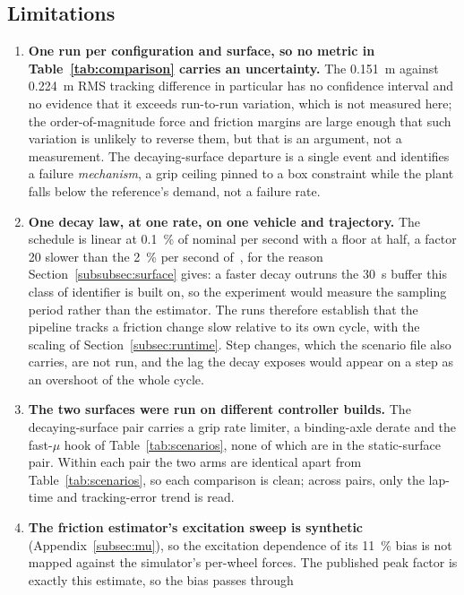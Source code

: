 \subsection{Limitations}
\label{subsec:limits}

\begin{enumerate}
\item \textbf{One run per configuration and surface, so no metric in
Table~\ref{tab:comparison} carries an uncertainty.} The \SI{0.151}{\meter}
against \SI{0.224}{\meter} RMS tracking difference in particular has no
confidence interval and no evidence that it exceeds run-to-run variation, which
is not measured here; the order-of-magnitude force and friction margins are
large enough that such variation is unlikely to reverse them, but that is an
argument, not a measurement. The decaying-surface departure is a single event
and identifies a failure \emph{mechanism}, a grip ceiling pinned to a box
constraint while the plant falls below the reference's demand, not a failure
rate.
\item \textbf{One decay law, at one rate, on one vehicle and trajectory.} The
schedule is linear at \SI{0.1}{\percent} of nominal per second with a floor at
half, a factor \num{20} slower than the \SI{2}{\percent} per second
of~\cite{llampc2025}, for the reason Section~\ref{subsubsec:surface} gives: a
faster decay outruns the \SI{30}{\second} buffer this class of identifier is
built on, so the experiment would measure the sampling period rather than the
estimator. The runs therefore establish that the pipeline tracks a friction
change slow relative to its own cycle, with the scaling of
Section~\ref{subsec:runtime}. Step changes, which the scenario file also
carries, are not run, and the lag the decay exposes would appear on a step as
an overshoot of the whole cycle.
\item \textbf{The two surfaces were run on different controller builds.} The
decaying-surface pair carries a grip rate limiter, a binding-axle derate and the
fast-$\mu$ hook of Table~\ref{tab:scenarios}, none of which are in the
static-surface pair. Within each pair the two arms are identical apart from
Table~\ref{tab:scenarios}, so each comparison is clean; across pairs, only the
\oursarm{} lap-time and tracking-error trend is read.
\item \textbf{The friction estimator's excitation sweep is synthetic}
(Appendix~\ref{subsec:mu}), so the excitation dependence of its
\SI{11}{\percent} bias is not mapped against the simulator's per-wheel forces.
The published peak factor is exactly this estimate, so the bias passes through

\end{enumerate}
